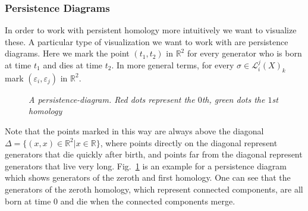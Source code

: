 \documentclass[11pt, a4paper, UKenglish]{article}
\newcommand{\bR}{\mathbb{R}}
\begin{document}
    \subsubsection{Persistence Diagrams}\label{subsec:persistence-diagrams}
    In order to work with persistent homology more intuitively we want to visualize these.
    A particular type of visualization we want to work with are persistence diagrams.
    Here we mark the point $(t_1,t_2)$ in $\bR^2$ for every generator who is born at time $t_1$ and dies at time $t_2$.
    In more general terms, for every $\sigma\in\mathcal{L}_i^j(X)_k$ mark $(\varepsilon_i,\varepsilon_j)$ in $\bR^2$.
    \begin{figure}
        \centering
        \caption{\textit{A persistence-diagram.
        Red dots represent the $0$th, green dots the $1$st homology}}
        \label{fig2}
    \end{figure}

	Note that the points marked in this way are always above the diagonal $\Delta=\{(x,x)\in\bR^2|x\in\bR\}$, where points directly on the diagonal represent generators that die quickly after birth, and points far from the diagonal represent generators that live very long.
    Fig.\ \ref{fig2} is an example for a persistence diagram which shows generators of the zeroth and first homology.
    One can see that the generators of the zeroth homology, which represent connected components, are all born at time $0$ and die when the connected components merge.\\
\end{document}
